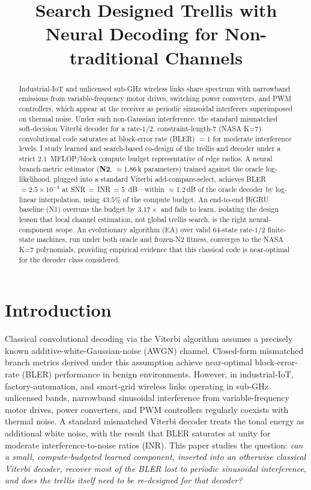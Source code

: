 \documentclass[conference]{IEEEtran}
\title{Search Designed Trellis with Neural Decoding for Non-traditional Channels}
\author{\IEEEauthorblockN{Abhishek Manjunath}
\IEEEauthorblockA{Department of Electrical Engineering\\
University of Southern California\\
\texttt{akmanjun@usc.edu}}}
\begin{document}
\maketitle

\begin{abstract}
Industrial-IoT and unlicensed sub-GHz wireless links share spectrum with
narrowband emissions from variable-frequency motor drives, switching power
converters, and PWM controllers, which appear at the receiver as periodic
sinusoidal interferers superimposed on thermal noise.  Under such
non-Gaussian interference, the standard mismatched soft-decision Viterbi
decoder for a rate-$1/2$, constraint-length-7 (NASA K=7) convolutional code
saturates at block-error rate (BLER) $=1$ for moderate interference levels.
I study learned and search-based co-design of the trellis and decoder
under a strict $2.1$~MFLOP/block compute budget representative of edge
radios.  A neural branch-metric estimator (\textbf{N2}, $\approx 1.86$\,k
parameters) trained against the oracle log-likelihood, plugged into a
standard Viterbi add-compare-select, achieves
BLER\,$=2.5{\times}10^{-3}$ at SNR\,$=$\,INR\,$=5$~dB---within
$\approx$1.2\,dB of the oracle decoder by log-linear interpolation,
using $43.5\%$ of the compute budget.  An end-to-end BiGRU baseline (N1)
overruns the budget by $3.17\times$ and fails to learn, isolating the
design lesson that local channel estimation, not global trellis search, is
the right neural-component scope.  An evolutionary algorithm (EA) over
valid 64-state rate-$1/2$ finite-state machines, run under both oracle
and frozen-N2 fitness, converges to the NASA K=7 polynomials, providing
empirical evidence that this classical code is near-optimal for the
decoder class considered.
\end{abstract}

\section{Introduction}

Classical convolutional decoding via the Viterbi algorithm assumes a
precisely known additive-white-Gaussian-noise (AWGN) channel.  Closed-form
mismatched branch metrics derived under this assumption achieve
near-optimal block-error-rate (BLER) performance in benign environments.
However, in industrial-IoT, factory-automation, and smart-grid wireless
links operating in sub-GHz unlicensed bands, narrowband sinusoidal
interference from variable-frequency motor drives, power converters, and
PWM controllers regularly coexists with thermal noise.  A standard
mismatched Viterbi decoder treats the tonal energy as additional
white noise, with the result that BLER saturates at unity for moderate
interference-to-noise ratios (INR).  This paper studies the question:
\emph{can a small, compute-budgeted learned component, inserted into an
otherwise classical Viterbi decoder, recover most of the BLER lost to
periodic sinusoidal interference, and does the trellis itself need to be
re-designed for that decoder?}
\end{document}
